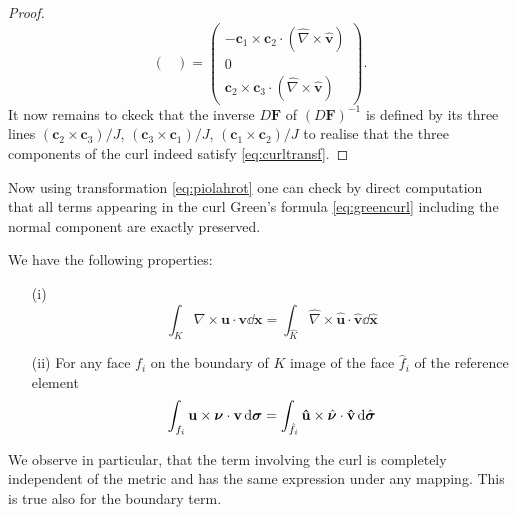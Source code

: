 \begin{proof}
$$\begin{pmatrix}
\end{pmatrix}
= 
 \begin{pmatrix}
-\mathbf{c}_1  \times \mathbf{c}_2 \cdot (\hat{\nabla}\times \hat{\mathbf{v}})  \\ 0\\
\mathbf{c}_2\times  \mathbf{c}_3 \cdot (\hat{\nabla}\times \hat{\mathbf{v}}) 
\end{pmatrix}.
$$
It now remains to ckeck that the inverse $D \mathbf{F}$ of $(D \mathbf{F})^{-1}$ is defined by its three
lines $(\mathbf{c}_2\times \mathbf{c}_3)/J$,  $(\mathbf{c}_3\times \mathbf{c}_1)/J$, $(\mathbf{c}_1\times \mathbf{c}_2)/J$ to realise that the three components of the curl indeed satisfy \eqref{eq:curltransf}.
\end{proof}
 
Now using  transformation  \eqref{eq:piolahrot} one can check by direct computation that all terms appearing in the curl Green's formula \eqref{eq:greencurl} including the normal component are exactly preserved.
\begin{proposition}
We have the following properties:
\begin{itemize}
\item[(i)]
\begin{equation}\label{eq:greencurltransf }
\int_K \nabla\times \mathbf{u}\cdot \mathbf{v} \dd \mathbf{x} = \int_{\hat{K}} \hat{\nabla}\times \hat{\mathbf{u}}
\cdot \hat{\mathbf{v}} \dd \hat{\mathbf{x}}
\end{equation}
\item[(ii)] For any face $f_i$ on the boundary of $K$ image of the face $\hat{f}_i$ of the reference element
\begin{equation}\label{eq:greencurltransfb}\int_{f_i} \mathbf{u}\times \boldsymbol{\nu} \cdot \mathbf{v} \,{\rm d} \boldsymbol{\sigma} =
\int_{ \hat{f}_i} \mathbf{\hat{u}}\times \hat{\boldsymbol{\nu}} \cdot \mathbf{\hat{v}} \,{\rm d} \hat{\boldsymbol{\sigma}}
\end{equation}
\end{itemize}
\end{proposition}
We observe in particular, that the term involving the curl is completely independent of the metric and has the same expression under any mapping. This is true also for the boundary term.


